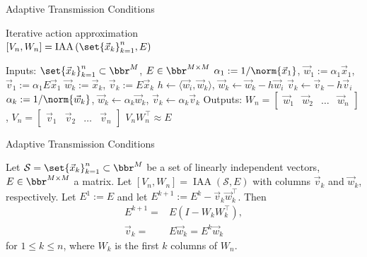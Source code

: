 \documentclass{beamer}
\DeclareMathOperator{\iaa}{IAA} %
\begin{document}
\begin{frame}{Adaptive Transmission Conditions}
\begin{algorithm}[H]
	\caption{Iterative action approximation \\ $[V_n,W_n]=\iaa \left ( \set{\vec{x}_k}_{k=1}^n, E \right )$}
	\begin{algorithmic}[1]
		\State Inputs: $\set{\vec{x}_k}_{k=1}^{n} \subset \bbr^M$, $E \in \bbr^{M \times M}$
		\State $\alpha_1 := 1 / \norm{\vec{x}_1}$, $\vec{w}_1 := \alpha_1 \vec{x}_1$, $\vec{v}_1 := \alpha_1 E \vec{x}_1$
			\State $\vec{w}_k := \vec{x}_k$, $\vec{v}_k := E \vec{x}_k$
				\State $h \gets \langle \vec{w}_i, \vec{w}_k \rangle$, $\vec{w}_k \gets \vec{w}_k - h \vec{w}_i$
				\State $\vec{v}_k \gets \vec{v}_k - h \vec{v}_i$ \label{line: implicit}
			\EndFor
			\State $\alpha_k := 1 / \norm{\vec{w}_k}$, $\vec{w}_k \gets \alpha_k \vec{w}_k$, $\vec{v}_k \gets \alpha_k \vec{v}_k$
		\EndFor
		\State Outputs: $W_{n} = \begin{bmatrix} \vec{w}_1 & \vec{w}_2 & \dots & \vec{w}_{n} \end{bmatrix}$, $V_{n} = \begin{bmatrix} \vec{v}_1 & \vec{v}_2 & \dots & \vec{v}_{n} \end{bmatrix}$
		\State $V_{n} W_{n}^\top \approx E$
	\end{algorithmic}
	\label{alg: IAA}
\end{algorithm}
\end{frame}

\begin{frame}{Adaptive Transmission Conditions}
\begin{lemma} \label{lem: iaa}
	Let $\mathcal{S}=\set{\vec{x}_k}_{k=1}^n \subset \bbr^M$ be a set of linearly independent vectors, $E \in \bbr^{M \times M}$ a matrix.
	Let $[V_n,W_n]=\iaa(\mathcal{S},E)$ with columns $\vec{v}_k$ and $\vec{w}_k$, respectively.
	Let $E^1 := E$ and let $E^{k+1} := E^k - \vec{v}_k \vec{w}_k^\top$.
	Then
	\begin{align*}
		E^{k+1} = & E (I - W_k W_k^\top), \\
		\vec{v}_k = & E \vec{w}_k = E^k \vec{w}_k
	\end{align*}
	for $1 \leq k \leq n$, where $W_k$ is the first $k$ columns of $W_n$.
\end{lemma}
\end{frame}
\end{document}
